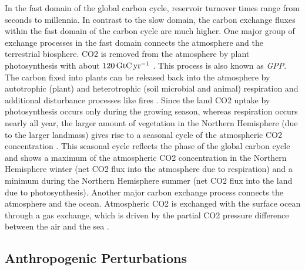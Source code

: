 In the fast domain of the global carbon cycle, reservoir turnover times range
from seconds to millennia. In contrast to the slow domain, the carbon exchange
fluxes within the fast domain of the carbon cycle are much higher. One major
group of exchange processes in the fast domain connects the atmosphere and the
terrestrial biosphere. \Ac{CO2} is removed from the atmosphere by plant
photosynthesis with about $120 \unit{\GtCyr{}}$ \autocite{Ciais2013}. This
process is also known as \emph{\ac{GPP}}. The carbon fixed into plants can be
released back into the atmosphere by autotrophic (plant) and heterotrophic
(soil microbial and animal) respiration and additional disturbance processes
like fires \autocite{Ciais2013}. Since the land \ac{CO2} uptake by
photosynthesis occurs only during the growing season, whereas respiration
occurs nearly all year, the larger amount of vegetation in the Northern
Hemisphere (due to the larger landmass) gives rise to a seasonal cycle of the
atmospheric \ac{CO2} concentration \autocite{Keeling1995}. This seasonal cycle
reflects the phase of the global carbon cycle and shows a maximum of the
atmospheric \ac{CO2} concentration in the Northern Hemisphere winter (net
\ac{CO2} flux into the atmosphere due to respiration) and a minimum during the
Northern Hemisphere summer (net \ac{CO2} flux into the land due to
photosynthesis). Another major carbon exchange process connects the atmosphere
and the ocean. Atmospheric \ac{CO2} is exchanged with the surface ocean through
a gas exchange, which is driven by the partial \ac{CO2} pressure difference
between the air and the sea \autocite{Ciais2013}.


\subsection{Anthropogenic Perturbations}
\label{subsec:02:carbon_cycle_perturbations}

